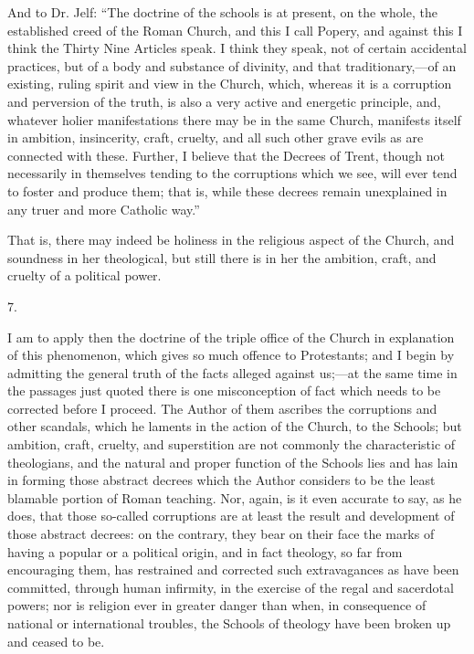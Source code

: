 And to Dr. Jelf: ``The doctrine of the schools is at present,
on the whole, the established creed of the Roman Church, and this I
call Popery, and against this I think the Thirty Nine Articles speak.
I think they speak, not of certain accidental practices, but of a body
and substance of divinity, and that traditionary,—of an existing,
ruling spirit and view in the Church, which, whereas it is a
corruption and perversion of the truth, is also a very active and
energetic principle, and, whatever holier manifestations there may be
in the same Church, manifests itself in ambition, insincerity, craft,
cruelty, and all such other grave evils as are connected with these.
Further, I believe that the Decrees of Trent, though not necessarily
in themselves tending to the corruptions which we see, will ever tend
to foster and produce them; that is, while these decrees remain
unexplained in any truer and more Catholic way.''

That is, there may indeed be holiness in the religious aspect of
the Church, and soundness in her theological, but still there is in
her the ambition, craft, and cruelty of a political power.

7.

I am to apply then the doctrine of the triple office of the Church
in explanation of this phenomenon, which gives so much offence to
Protestants; and I begin by admitting the general truth of the facts
alleged against us;—at the same time in the passages just quoted
there is one misconception of fact which needs to be corrected before
I proceed. The Author of them ascribes the corruptions and other
scandals, which he laments in the action of the Church, to the
Schools; but ambition, craft, cruelty, and superstition are not
commonly the characteristic of theologians, and the natural and proper
function of the Schools lies and has lain in forming those abstract
decrees which the Author considers to be the least blamable portion of
Roman teaching. Nor, again, is it even accurate to say, as he does,
that those so-called corruptions are at least the result and
development of those abstract decrees: on the contrary, they bear on
their face the marks of having a popular or a political origin, and in
fact theology, so far from encouraging them, has restrained and
corrected such extravagances as have been committed, through human
infirmity, in the exercise of the regal and sacerdotal powers; nor is
religion ever in greater danger than when, in consequence of national
or international troubles, the Schools of theology have been broken up
and ceased to be.

